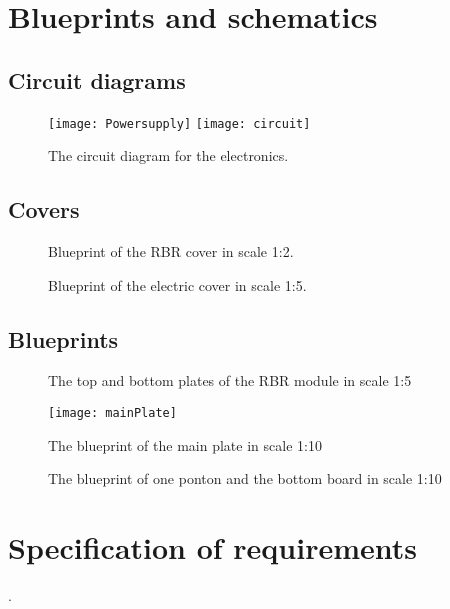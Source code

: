 \clearpage
\section{Blueprints and schematics}\label{sec:appendix-b}
\subsection{Circuit diagrams}
\begin{figure}[H]
  \centering
  \texttt{[image: Powersupply]}
  \texttt{[image: circuit]}
  \caption{The circuit diagram for the electronics.}
  \label{fig:appendix-circuit-diagrams}
\end{figure}

\clearpage
\subsection{Covers}
\begin{figure}[H]
  \centering
  \caption{Blueprint of the RBR cover in scale 1:2.}
  \label{fig:appendix-blueprint-rbr-cover}
\end{figure}

\begin{figure}[H]
  \centering
  \caption{Blueprint of the electric cover in scale 1:5.}
  \label{fig:appendix-blueprint-electronic-cover}
\end{figure}

\clearpage
\subsection{Blueprints}
\begin{figure}[H]
  \centering
  \caption{The top and bottom plates of the RBR module in scale 1:5}
  \label{fig:appendix-blueprint-rbr-module}
\end{figure}

\begin{figure}[H]
    \centering
    \texttt{[image: mainPlate]}
    \caption{The blueprint of the main plate in scale 1:10}
    \label{fig:appendix-blueprint-main-plate}
\end{figure}

\begin{figure}[H]
    \centering
    \caption{The blueprint of one ponton and the bottom board in scale 1:10}
    \label{fig:appendix-blueprint-ponton}
\end{figure}

\clearpage
\section{Specification of requirements}\label{kravspec}
.
